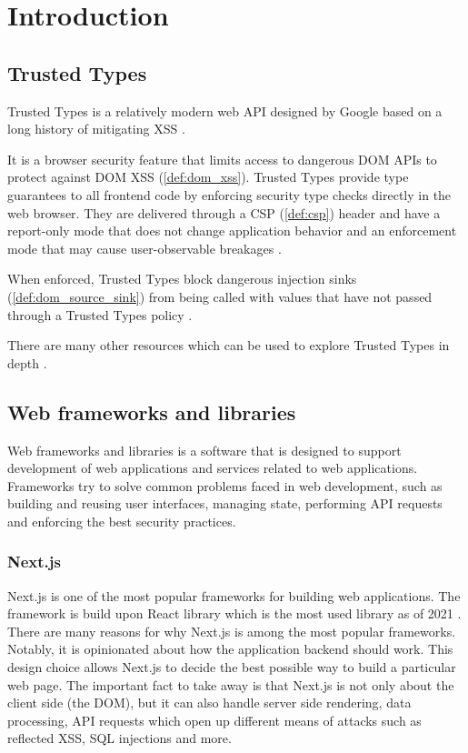 \chapter{Introduction}

\section{Trusted Types}

Trusted Types is a relatively modern web API designed by Google based on a long history of
mitigating XSS \cite{tt_design_history}.

It is a browser security feature that limits access to dangerous DOM APIs to protect against DOM XSS
(\ref{def:dom_xss}). Trusted Types provide type guarantees to all frontend code by enforcing
security type checks directly in the web browser. They are delivered through a CSP (\ref{def:csp})
header and have a report-only mode that does not change application behavior and an enforcement mode
that may cause user-observable breakages \cite{tt_background}.

When enforced, Trusted Types block dangerous injection sinks (\ref{def:dom_source_sink}) from being
called with values that have not passed through a Trusted Types policy \cite{tt_background}.

There are many other resources which can be used to explore Trusted Types in depth
\cite{tt_resources}.

\section{Web frameworks and libraries}

Web frameworks and libraries is a software that is designed to support development of web
applications and services related to web applications. Frameworks try to solve common problems faced
in web development, such as building and reusing user interfaces, managing state, performing API
requests and enforcing the best security practices.

\subsection{Next.js}
\label{intro-nextjs}

Next.js is one of the most popular frameworks for building web applications. The framework is build
upon React library which is the most used library as of 2021 \cite{react_most_used_2021}. There are
many reasons for why Next.js is among the most popular frameworks. Notably, it is opinionated about
how the application backend should work. This design choice allows Next.js to decide the best
possible way to build a particular web page. The important fact to take away is that Next.js is not
only about the client side (the DOM), but it can also handle server side rendering, data processing,
API requests which open up different means of attacks such as reflected XSS, SQL injections and
more.

